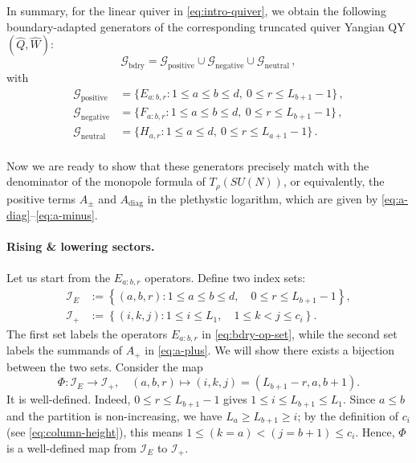 \documentclass[12pt,a4paper]{article}
\newcommand{\cG}{\mathcal{G}}
\begin{document}
\medskip

In summary, for the linear quiver in \eqref{eq:intro-quiver}, we obtain the following boundary-adapted generators of the corresponding truncated quiver Yangian QY$(\hat{Q},\hat W)$:
\begin{equation}\label{eq:bdry-adapted gen}
    \cG_{\text{bdry}}=\cG_{\text{positive}}\cup \cG_{\text{negative}}\cup\cG_{\text{neutral}}\,,
\end{equation}
with
\begin{equation}\label{eq:bdry-op-set}
\begin{aligned}
    \cG_{\text{positive}}&=\{E_{a:b,r}:1\leq a\leq b\leq d,\ 0\leq r \leq L_{b+1}-1\}\,,\\
    \cG_{\text{negative}}&=\{F_{a:b,r}:1\leq a\leq b\leq d,\ 0\leq r \leq L_{b+1}-1\}\,,\\
    \cG_{\text{neutral}}&=\{H_{a,r}:1\leq a\leq d,\ 0\leq r \leq L_{a+1}-1\}\,.\\
\end{aligned}
\end{equation}



Now we are ready to show that these generators precisely match with the denominator of the monopole formula of $T_\rho(SU(N))$, or equivalently, the positive terms $A_\pm$ and $A_\text{diag}$ in the plethystic logarithm, which are given by \eqref{eq:a-diag}--\eqref{eq:a-minus}. 

\paragraph{Rising \& lowering sectors.}
Let us start from the $E_{a:b,r}$ operators. Define two index sets:
\begin{equation}
 \begin{aligned}
  \mathcal I_E
   &:=\left\{(a,b,r):1\leq a\leq b\leq d,\quad
                 0\leq r\leq L_{b+1}-1\right\},\\
  \mathcal I_+
   &:=\left\{(i,k,j):1\leq i\leq L_1,\quad
                 1\leq k<j\leq c_i\right\}.
 \end{aligned}
 \label{eq:E-index-sets}
\end{equation}
The first set labels the operators $E_{a:b,r}$ in \eqref{eq:bdry-op-set}, while the second set labels the summands of $A_+$ in \eqref{eq:a-plus}. We will show there exists a bijection between the two sets. 
Consider the map
\begin{equation}
 \Phi:\mathcal I_E\longrightarrow\mathcal I_+,\quad
 (a,b,r)\longmapsto (i,k,j)=(L_{b+1}-r,a,b+1).
 \label{eq:E-index-map}
\end{equation}
It is well-defined.  Indeed, $0\leq r\leq L_{b+1}-1$ gives
$1\leq i\leq L_{b+1}\leq L_1$.  Since $a\leq b$ and the partition is non-increasing, we have
$L_a\geq L_{b+1}\geq i$; by the definition of $c_i$ (see \eqref{eq:column-height}), this means $1\leq (k=a)<(j=b+1)\leq c_i$. Hence, $\Phi$ is a well-defined map from $\mathcal{I}_E$ to $\mathcal I_+$.
\end{document}
